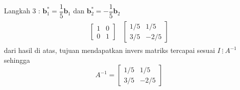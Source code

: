 \documentclass{article}   %
\begin{document}
Langkah 3 : $\textbf{b}^*_1= \dfrac{1}{5}\textbf{b}_1 $ dan $\textbf{b}^*_2= -\dfrac{1}{5}\textbf{b}_2$ \\
\begin{align*}
	\begin{array}{r|r} 
		\left[
		\begin{array}{rr} 
			1 & 0 \\
			0 & 1 
		\end{array} 
		\right]  &  \left[
		\begin{array}{rr} 
			1/5 & 1/5 \\
			3/5 & -2/5 
		\end{array} 
		\right]
	\end{array}
\end{align*}
dari hasil di atas, tujuan mendapatkan invers matriks  tercapai sesuai $I ~\vdots~ A^{-1}$ sehingga $$A^{-1}=\left[
\begin{array}{rr} 
	1/5 & 1/5 \\
	3/5 & -2/5 
\end{array} 
\right]$$
\end{document}
